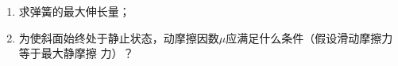 \begin{enumerate}
\begin{enumerate}
\item 
求弹簧的最大伸长量；

\item 
为使斜面始终处于静止状态，动摩擦因数$ \mu $应满足什么条件（假设滑动摩擦力等于最大静摩擦
力）？

	
\end{enumerate}
\begin{figure}[h!]
	\flushright
	
\end{figure}










	
	
	
\end{enumerate}

